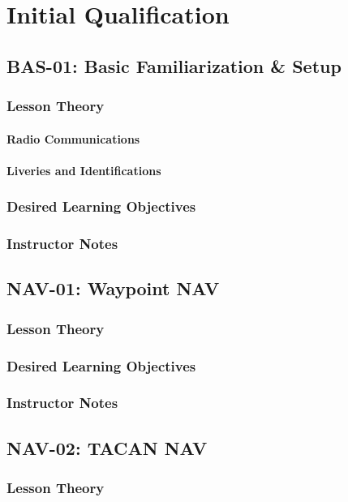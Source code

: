 \part{Initial Qualification}
  \chapter{BAS-01: Basic Familiarization \& Setup}
    \section{Lesson Theory}
      \subsection{Radio Communications}
      \subsection{Liveries and Identifications}
    \section{Desired Learning Objectives}
    \section{Instructor Notes}

  \chapter{NAV-01: Waypoint NAV}
    \section{Lesson Theory}
    \section{Desired Learning Objectives}
    \section{Instructor Notes}

  \chapter{NAV-02: TACAN NAV}
    \section{Lesson Theory}
